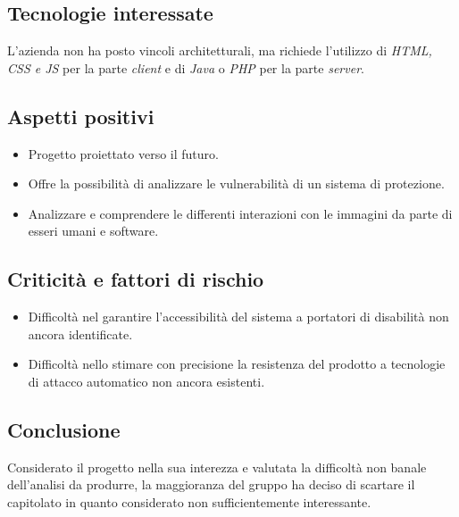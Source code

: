 \subsection{Tecnologie interessate}
L’azienda non ha posto vincoli architetturali, ma richiede l’utilizzo di \textit{HTML, CSS e JS}
per la parte \textit{client} e di \textit{Java} o \textit{PHP} per la parte \textit{server}.

\subsection{Aspetti positivi}
\begin{itemize}
    \item Progetto proiettato verso il futuro.
    \item Offre la possibilità di analizzare le vulnerabilità di un sistema di protezione.
    \item Analizzare e comprendere le differenti interazioni con le immagini da parte di esseri umani e software.
\end{itemize}

\subsection{Criticità e fattori di rischio}
\begin{itemize}
    \item Difficoltà nel garantire l'accessibilità del sistema a portatori di disabilità non ancora identificate.
    \item Difficoltà nello stimare con precisione la resistenza del prodotto a tecnologie di attacco automatico non ancora esistenti.
\end{itemize}

\subsection{Conclusione}
Considerato il progetto nella sua interezza e valutata la difficoltà non banale dell'analisi da produrre,
la maggioranza del gruppo ha deciso di scartare il capitolato in quanto considerato
non sufficientemente interessante.
